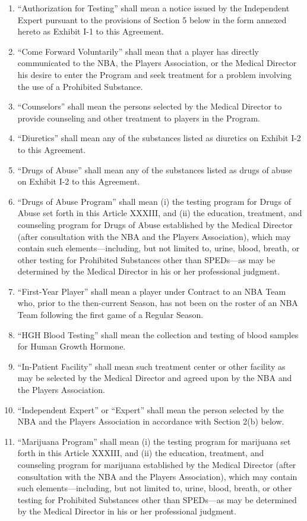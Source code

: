 \documentclass[
]{book}
\providecommand{\tightlist}{%
  \setlength{\itemsep}{0pt}\setlength{\parskip}{0pt}}
\begin{document}
\begin{enumerate}
\def\labelenumi{(\alph{enumi})}
\tightlist
\item
  ``Authorization for Testing'' shall mean a notice issued by the Independent Expert pursuant to the provisions of Section 5 below in the form annexed hereto as Exhibit I-1 to this Agreement.
\item
  ``Come Forward Voluntarily'' shall mean that a player has directly communicated to the NBA, the Players Association, or the Medical Director his desire to enter the Program and seek treatment for a problem involving the use of a Prohibited Substance.
\item
  ``Counselors'' shall mean the persons selected by the Medical Director to provide counseling and other treatment to players in the Program.
\item
  ``Diuretics'' shall mean any of the substances listed as diuretics on Exhibit I-2 to this Agreement.
\item
  ``Drugs of Abuse'' shall mean any of the substances listed as drugs of abuse on Exhibit I-2 to this Agreement.
\item
  ``Drugs of Abuse Program'' shall mean (i) the testing program for Drugs of Abuse set forth in this Article XXXIII, and (ii) the education, treatment, and counseling program for Drugs of Abuse established by the Medical Director (after consultation with the NBA and the Players Association), which may contain such elements---including, but not limited to, urine, blood, breath, or other testing for Prohibited Substances other than SPEDs---as may be determined by the Medical Director in his or her professional judgment.
\item
  ``First-Year Player'' shall mean a player under Contract to an NBA Team who, prior to the then-current Season, has not been on the roster of an NBA Team following the first game of a Regular Season.
\item
  ``HGH Blood Testing'' shall mean the collection and testing of blood samples for Human Growth Hormone.
\item
  ``In-Patient Facility'' shall mean such treatment center or other facility as may be selected by the Medical Director and agreed upon by the NBA and the Players Association.
\item
  ``Independent Expert'' or ``Expert'' shall mean the person selected by the NBA and the Players Association in accordance with Section 2(b) below.
\item
  ``Marijuana Program'' shall mean (i) the testing program for marijuana set forth in this Article XXXIII, and (ii) the education, treatment, and counseling program for marijuana established by the Medical Director (after consultation with the NBA and the Players Association), which may contain such elements---including, but not limited to, urine, blood, breath, or other testing for Prohibited Substances other than SPEDs---as may be determined by the Medical Director in his or her professional judgment.

\end{enumerate}
\end{document}
